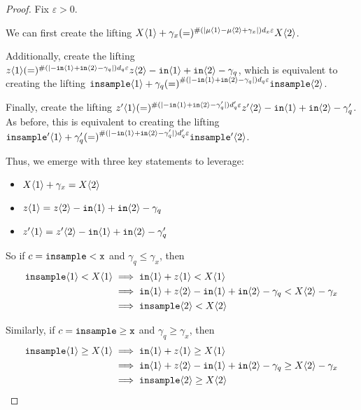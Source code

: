 \begin{proof}
Fix $\varepsilon>0$.

We can first create the lifting $X\brangle{1}+\gamma_x (=)^{\#(|\mu\brangle{1}-\mu\brangle{2}+\gamma_x|)d_x\varepsilon}X\brangle{2}$. 

Additionally, create the lifting $z\brangle{1} (=)^{\#(|-\texttt{in}\brangle{1}+\texttt{in}\brangle{2}-\gamma_q|)d_q\varepsilon}z\brangle{2} - \texttt{in}\brangle{1}+\texttt{in}\brangle{2}-\gamma_q$, which is equivalent to creating the lifting $\texttt{insample}\brangle{1} +\gamma_q{(=)}^{\#(|-\texttt{in}\brangle{1}+\texttt{in}\brangle{2}-\gamma_q|)d_q\varepsilon}\texttt{insample}\brangle{2}$.

Finally, create the lifting $z'\brangle{1} (=)^{\#(|-\texttt{in}\brangle{1}+\texttt{in}\brangle{2}-\gamma_q'|)d_q'\varepsilon}z'\brangle{2} - \texttt{in}\brangle{1}+\texttt{in}\brangle{2}-\gamma_q'$. As before, this is equivalent to creating the lifting $\texttt{insample}'\brangle{1} +\gamma_q'{(=)}^{\#(|-\texttt{in}\brangle{1}+\texttt{in}\brangle{2}-\gamma_q'|)d_q'\varepsilon}\texttt{insample}'\brangle{2}$.

Thus, we emerge with three key statements to leverage:\begin{itemize}
    \item $X\brangle{1} + \gamma_x = X\brangle{2}$
    \item $z\brangle{1} = z\brangle{2} - \texttt{in}\brangle{1}+\texttt{in}\brangle{2}-\gamma_q$
    \item $z'\brangle{1} = z'\brangle{2} - \texttt{in}\brangle{1}+\texttt{in}\brangle{2}-\gamma_q'$
\end{itemize}

So if $c=\lguard[\texttt{x}]$ and $\gamma_q\leq \gamma_x$, then \begin{align*}
    \texttt{insample}\brangle{1}<X\brangle{1}&\implies \texttt{in}\brangle{1}+z\brangle{1}<X\brangle{1}\\
    &\implies \texttt{in}\brangle{1}+z\brangle{2}-\texttt{in}\brangle{1}+\texttt{in}\brangle{2}-\gamma_q<X\brangle{2}-\gamma_x\\
    &\implies \texttt{insample}\brangle{2}<X\brangle{2}
\end{align*}

Similarly, if $c=\gguard[\texttt{x}]$ and $\gamma_q\geq \gamma_x$, then \begin{align*}
    \texttt{insample}\brangle{1}\geq X\brangle{1}&\implies \texttt{in}\brangle{1}+z\brangle{1}\geq X\brangle{1}\\
    &\implies \texttt{in}\brangle{1}+z\brangle{2}-\texttt{in}\brangle{1}+\texttt{in}\brangle{2}-\gamma_q\geq X\brangle{2}-\gamma_x\\
    &\implies \texttt{insample}\brangle{2}\geq X\brangle{2}
\end{align*}


\end{proof}
